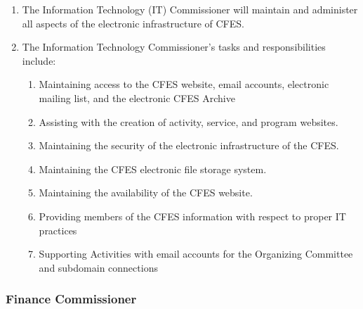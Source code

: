 \begin{enumerate}
 \item
  The Information Technology (IT) Commissioner will maintain and administer all aspects of the electronic infrastructure of CFES.
 \item
  The Information Technology Commissioner’s tasks and responsibilities include:

  \begin{enumerate}
   \item
    Maintaining access to the CFES website, email accounts, electronic mailing list, and the electronic CFES Archive
   \item
    Assisting with the creation of activity, service, and program websites.
   \item
    Maintaining the security of the electronic infrastructure of the CFES.
   \item
    Maintaining the CFES electronic file storage system.
   \item
    Maintaining the availability of the CFES website.
   \item
    Providing members of the CFES information with respect to proper IT practices
   \item
    Supporting Activities with email accounts for the Organizing Committee and subdomain connections
  \end{enumerate}
\end{enumerate}

\subsubsection{Finance Commissioner}
\label{finance-commissioner}

